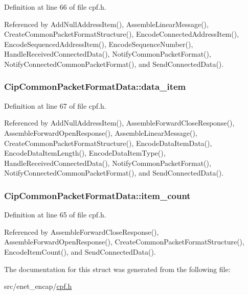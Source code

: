 \-Definition at line 66 of file cpf.\-h.



\-Referenced by \-Add\-Null\-Address\-Item(), \-Assemble\-Linear\-Message(), \-Create\-Common\-Packet\-Format\-Structure(), \-Encode\-Connected\-Address\-Item(), \-Encode\-Sequenced\-Address\-Item(), \-Encode\-Sequence\-Number(), \-Handle\-Received\-Connected\-Data(), \-Notify\-Common\-Packet\-Format(), \-Notify\-Connected\-Common\-Packet\-Format(), and \-Send\-Connected\-Data().

\hypertarget{structCipCommonPacketFormatData_a054b7138d1a6837b9ade41b17635bc96}{
\subsubsection[{data\-\_\-item}]{ {\bf \-Cip\-Common\-Packet\-Format\-Data\-::data\-\_\-item}}}\label{db/d80/structCipCommonPacketFormatData_a054b7138d1a6837b9ade41b17635bc96}


\-Definition at line 67 of file cpf.\-h.



\-Referenced by \-Add\-Null\-Address\-Item(), \-Assemble\-Forward\-Close\-Response(), \-Assemble\-Forward\-Open\-Response(), \-Assemble\-Linear\-Message(), \-Create\-Common\-Packet\-Format\-Structure(), \-Encode\-Data\-Item\-Data(), \-Encode\-Data\-Item\-Length(), \-Encode\-Data\-Item\-Type(), \-Handle\-Received\-Connected\-Data(), \-Notify\-Common\-Packet\-Format(), \-Notify\-Connected\-Common\-Packet\-Format(), and \-Send\-Connected\-Data().

\hypertarget{structCipCommonPacketFormatData_a7ff1108c27f9ebe1d69305311c6b234b}{
\subsubsection[{item\-\_\-count}]{ {\bf \-Cip\-Common\-Packet\-Format\-Data\-::item\-\_\-count}}}\label{db/d80/structCipCommonPacketFormatData_a7ff1108c27f9ebe1d69305311c6b234b}


\-Definition at line 65 of file cpf.\-h.



\-Referenced by \-Assemble\-Forward\-Close\-Response(), \-Assemble\-Forward\-Open\-Response(), \-Create\-Common\-Packet\-Format\-Structure(), \-Encode\-Item\-Count(), and \-Send\-Connected\-Data().



\-The documentation for this struct was generated from the following file\-:\begin{DoxyCompactItemize}
\item 
src/enet\-\_\-encap/\hyperlink{cpf_8h}{cpf.\-h}\end{DoxyCompactItemize}
